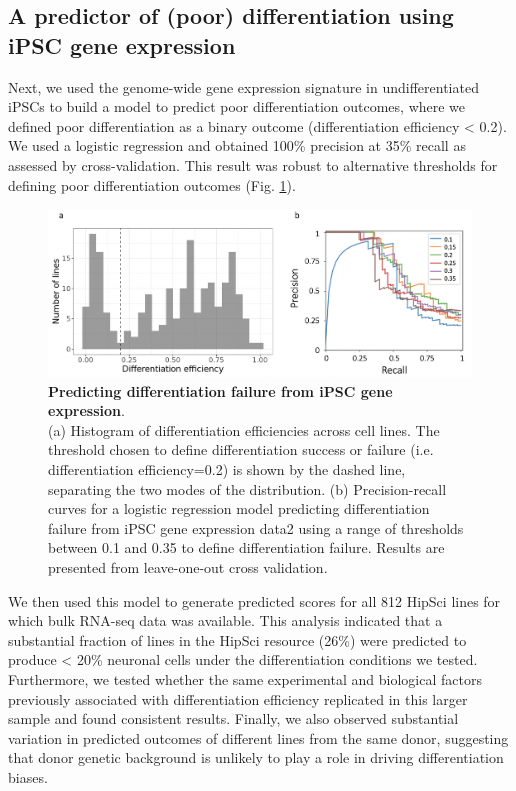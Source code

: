 \subsection{A predictor of (poor) differentiation using iPSC gene expression}

Next, we used the genome-wide gene expression signature in undifferentiated iPSCs to build a model to predict poor differentiation outcomes, where we defined poor differentiation as a binary outcome (differentiation efficiency < 0.2).
We used a logistic regression and obtained 100\% precision at 35\% recall as assessed by cross-validation. 
This result was robust to alternative thresholds for defining poor differentiation outcomes (Fig. \ref{fig:neuroseq_diff_eff_predictor}). 

\begin{figure}[h]
\centering
\includegraphics[width=15.5cm]{Chapter5/Fig/neuroseq_diff_eff_predict.png}
\caption[Predicting differentiation failure from iPSC gene expression]{\textbf{Predicting differentiation failure from iPSC gene expression}.\\
(a) Histogram of differentiation efficiencies across cell lines. 
The threshold chosen to define differentiation success or failure (i.e. differentiation efficiency=0.2) is shown by the dashed line, separating the two modes of the distribution. 
(b) Precision-recall curves for a logistic regression model predicting differentiation failure from iPSC gene expression data2 using a range of thresholds between 0.1 and 0.35 to define differentiation failure. 
Results are presented from leave-one-out cross validation.}
\label{fig:neuroseq_diff_eff_predictor}
\end{figure}

We then used this model to generate predicted scores for all 812 HipSci lines for which bulk RNA-seq data was available.
This analysis indicated that a substantial fraction of lines in the HipSci resource (26\%) were predicted to produce < 20\% neuronal cells under the differentiation conditions we tested.
Furthermore, we tested whether the same experimental and biological factors previously associated with differentiation efficiency replicated in this larger sample and found consistent results.
Finally, we also observed substantial variation in predicted outcomes of different lines from the same donor, suggesting that donor genetic background is unlikely to play a role in driving differentiation biases.


